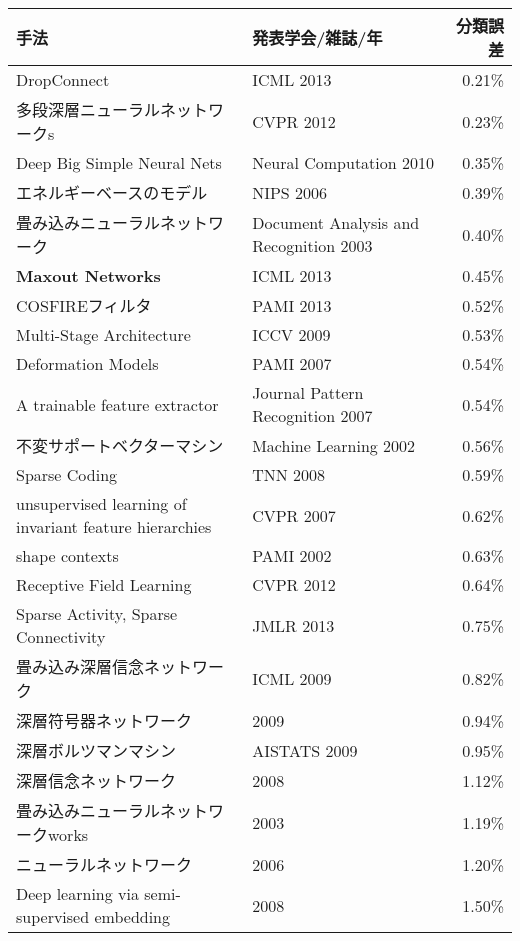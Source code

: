     \begin{tabular}{|p{7cm}|p{5cm}|r|}\hline
    手法 & 発表学会/雑誌/年 & 分類誤差 \\ \hline
    DropConnect \cite{wan2013regularization}& ICML 2013 & 0.21\% \\ \hline
    多段深層ニューラルネットワークs \cite{ciresan2012multi-column}& CVPR 2012 & 0.23\% \\ \hline
    Deep Big Simple Neural Nets \cite{ciresan2010deep}& Neural Computation 2010 & 0.35\% \\ \hline
    エネルギーベースのモデル\cite{poultney2006efficient}& NIPS 2006 & 0.39\% \\ \hline
    畳み込みニューラルネットワーク \cite{simard2003best}& Document Analysis and Recognition 2003 & 0.40\% \\ \hline
    \textbf{Maxout Networks} \cite{goodfellow2013maxout}& ICML 2013 & 0.45\% \\ \hline
    COSFIREフィルタ \cite{azzopardi2013trainable}& PAMI 2013 & 0.52\% \\ \hline
    Multi-Stage Architecture \cite{jarrett2009what}& ICCV 2009 & 0.53\% \\ \hline
    Deformation Models \cite{keysers2007deformation}& PAMI 2007 & 0.54\% \\ \hline
    A trainable feature extractor \cite{lauer2007a-trainable}& Journal Pattern Recognition 2007   & 0.54\% \\ \hline
    不変サポートベクターマシン \cite{decoste2002training}& Machine Learning 2002 & 0.56\% \\ \hline
    Sparse Coding \cite{labusch2008simple}& TNN 2008 & 0.59\% \\ \hline
    unsupervised learning of invariant feature hierarchies \cite{ranzato2007unsupervised}& CVPR 2007 & 0.62\% \\ \hline
    shape contexts \cite{belongie2002shape}& PAMI 2002 & 0.63\% \\ \hline
    Receptive Field Learning \cite{jia2012beyond}& CVPR 2012 & 0.64\% \\ \hline
    Sparse Activity, Sparse Connectivity \cite{thom2013sparse}& JMLR 2013 & 0.75\% \\ \hline
    畳み込み深層信念ネットワーク \cite{lee2009convolutional}& ICML 2009 & 0.82\% \\ \hline
    深層符号器ネットワーク \cite{min2009large-margin}& 2009 & 0.94\% \\ \hline
    深層ボルツマンマシン \cite{salakhutdinov2009deep}& AISTATS 2009 & 0.95\% \\ \hline
    深層信念ネットワーク \cite{dahl2008cs81:}& 2008 & 1.12\% \\ \hline
    畳み込みニューラルネットワークworks  \cite{simard2003best}& 2003 & 1.19\% \\ \hline
    ニューラルネットワーク \cite{hinton2006reducing}& 2006 & 1.20\% \\ \hline
    Deep learning via semi-supervised embedding \cite{weston2012deep}& 2008 & 1.50\% \\ \hline
    \end{tabular}%
